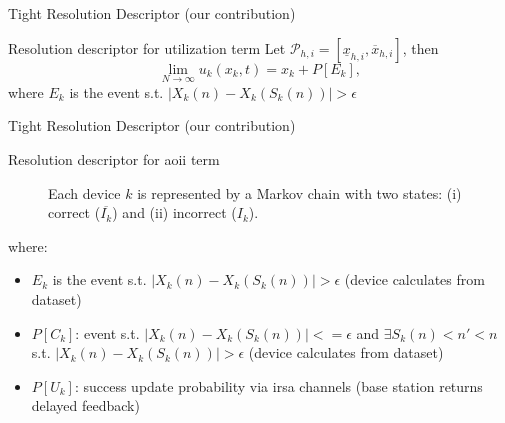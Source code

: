 \documentclass[9pt]{beamer}
\begin{document}
\begin{frame}{Tight Resolution Descriptor (our contribution)}
    \begin{block}{Resolution descriptor for utilization term}
        Let $\mathcal{P}_{h, i} = [\underline{x}_{h, i}, \overline{x}_{h, i}]$, then
        \begin{equation}
            \lim_{N \rightarrow \infty}  u_k(x_k, t) = x_k + P[E_k],
        \end{equation}
        where $E_k$ is the event s.t. $|X_k(n) - X_k(S_k(n))| > \epsilon$
    \end{block}
\end{frame}

\begin{frame}{Tight Resolution Descriptor (our contribution)}
    \begin{block}{Resolution descriptor for \gls{aoii} term}
        \begin{figure}
            \centering
            \caption{Each device $k$ is represented by a Markov chain with two states: (i) correct ($\overline{I_k}$) and (ii) incorrect ($I_k$). }
            \label{fig:fundamental:system:gilbert_elliot}
        \end{figure}
        where:
        \begin{itemize}
            \item $E_k$ is the event s.t. $|X_k(n) - X_k(S_k(n))| > \epsilon$ (\alert{device calculates from dataset})
            \item $P[C_k]$: event s.t. $|X_k(n) - X_k(S_k(n))| <= \epsilon$ and $\exists S_k(n) < n' < n$ s.t. $|X_k(n) - X_k(S_k(n))| > \epsilon$ (\alert{device calculates from dataset})
            \item $P[U_k]$: success update probability via \gls{irsa} channels (\alert{base station returns delayed feedback})
        \end{itemize}
    \end{block}
\end{frame}
\end{document}
